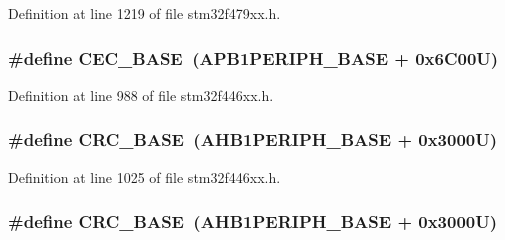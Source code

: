 Definition at line 1219 of file stm32f479xx.\+h.

\subsubsection[{\texorpdfstring{C\+E\+C\+\_\+\+B\+A\+SE}{CEC_BASE}}]{\setlength{\rightskip}{0pt plus 5cm}\#define C\+E\+C\+\_\+\+B\+A\+SE~({\bf A\+P\+B1\+P\+E\+R\+I\+P\+H\+\_\+\+B\+A\+SE} + 0x6\+C00\+U)}\hypertarget{group___peripheral__memory__map_gaacb77bc44b3f8c87ab98f241e760e440}{}\label{group___peripheral__memory__map_gaacb77bc44b3f8c87ab98f241e760e440}


Definition at line 988 of file stm32f446xx.\+h.

\subsubsection[{\texorpdfstring{C\+R\+C\+\_\+\+B\+A\+SE}{CRC_BASE}}]{\setlength{\rightskip}{0pt plus 5cm}\#define C\+R\+C\+\_\+\+B\+A\+SE~({\bf A\+H\+B1\+P\+E\+R\+I\+P\+H\+\_\+\+B\+A\+SE} + 0x3000\+U)}\hypertarget{group___peripheral__memory__map_ga656a447589e785594cbf2f45c835ad7e}{}\label{group___peripheral__memory__map_ga656a447589e785594cbf2f45c835ad7e}


Definition at line 1025 of file stm32f446xx.\+h.

\subsubsection[{\texorpdfstring{C\+R\+C\+\_\+\+B\+A\+SE}{CRC_BASE}}]{\setlength{\rightskip}{0pt plus 5cm}\#define C\+R\+C\+\_\+\+B\+A\+SE~({\bf A\+H\+B1\+P\+E\+R\+I\+P\+H\+\_\+\+B\+A\+SE} + 0x3000\+U)}\hypertarget{group___peripheral__memory__map_ga656a447589e785594cbf2f45c835ad7e}{}\label{group___peripheral__memory__map_ga656a447589e785594cbf2f45c835ad7e}


